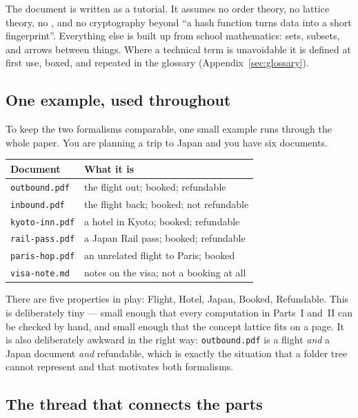 The document is written as a tutorial. It assumes no order theory, no lattice
theory, no \fca{}, and no cryptography beyond ``a hash function turns data
into a short fingerprint''. Everything else is built up from school
mathematics: sets, subsets, and arrows between things. Where a technical term
is unavoidable it is defined at first use, boxed, and repeated in the glossary
(Appendix~\ref{sec:glossary}).

\subsection{One example, used throughout}
\label{sec:running-example}

To keep the two formalisms comparable, one small example runs through the
whole paper. You are planning a trip to Japan and you have six documents.

\begin{center}
\small
\begin{tabular}{lp{9.4cm}}
\toprule
\textbf{Document} & \textbf{What it is}\\
\midrule
\texttt{outbound.pdf}  & the flight out; booked; refundable\\
\texttt{inbound.pdf}   & the flight back; booked; not refundable\\
\texttt{kyoto-inn.pdf} & a hotel in Kyoto; booked; refundable\\
\texttt{rail-pass.pdf} & a Japan Rail pass; booked; refundable\\
\texttt{paris-hop.pdf} & an unrelated flight to Paris; booked\\
\texttt{visa-note.md}  & notes on the visa; not a booking at all\\
\bottomrule
\end{tabular}
\end{center}

There are five properties in play: \textsf{Flight}, \textsf{Hotel},
\textsf{Japan}, \textsf{Booked}, \textsf{Refundable}. This is deliberately
tiny --- small enough that every computation in Parts~I and~II can be checked
by hand, and small enough that the concept lattice fits on a page. It is also
deliberately awkward in the right way: \texttt{outbound.pdf} is a flight
\emph{and} a Japan document \emph{and} refundable, which is exactly the
situation that a folder tree cannot represent and that motivates both
formalisms.

\subsection{The thread that connects the parts}


